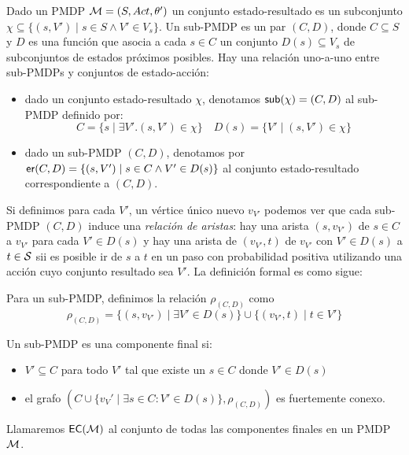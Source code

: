 \begin{definition}
	Dado un PMDP $\mathcal{M} = (S, Act, \theta')$ un conjunto estado-resultado es un subconjunto $\chi \subseteq \{(s, V') \mid s \in S \wedge V' \in V_s\}$. Un sub-PMDP es un par $(C, D)$, donde $C \subseteq S$ y $D$ es una función que asocia a cada $s \in C$ un conjunto $D(s) \subseteq V_s$ de subconjuntos de estados próximos posibles. Hay una relación uno-a-uno entre sub-PMDPs y conjuntos de estado-acción:

	\begin{itemize}
		\item dado un conjunto estado-resultado $\chi$, denotamos $\textsf{sub}(\chi) = (C, D)$ al
		      sub-PMDP definido por:
		      \[
			      C = \{s \mid \exists V' . (s, V') \in \chi\} \quad D(s) = \{V' \mid (s, V') \in \chi\}
		      \]

		\item dado un sub-PMDP $(C, D)$, denotamos por $\textsf{er}(C,D) = \{(s,V') \mid s \in C
			      \wedge V' \in D(s)\}$ al conjunto estado-resultado correspondiente a $(C, D)$.
	\end{itemize}
\end{definition}

Si definimos para cada $V'$, un vértice único nuevo $v_{V'}$ podemos ver que
cada sub-PMDP $(C, D)$ induce una \textit{relación de aristas}: hay una arista
$(s, v_{V'})$ de $s \in C$ a $v_{V'}$ para cada $V' \in D(s)$ y hay una arista
de $(v_{V'}, t)$ de $v_{V'}$ con $V' \in D(s)$ a $t \in \mathcal{S}$ sii es posible ir
de $s$ a $t$ en un paso con probabilidad positiva utilizando una acción cuyo
conjunto resultado sea $V'$. La definición formal es como sigue:

\begin{definition}
	Para un sub-PMDP, definimos la relación $\rho_{(C,D)}$ como
	\[
		\rho_{(C,D)} = \{(s, v_{V'}) \mid \exists V' \in D(s)\} \cup \{(v_{V'}, t) \mid t \in V' \}
	\]
\end{definition}

\begin{definition} \label{defEC}
	Un sub-PMDP es una componente final si:

	\begin{itemize}
		\item $V' \subseteq C$ para todo $V'$ tal que existe un $s \in C$ donde $V' \in D(s)$

		\item el grafo $(C \cup \{v_V' \mid \exists s \in C : V' \in D(s)\}, \rho_{(C,D)})$
		      es fuertemente conexo.
	\end{itemize}

	Llamaremos $\textsf{EC}(\mathcal{M})$ al conjunto de todas las componentes finales en un PMDP
	$\mathcal{M}$.
\end{definition}

